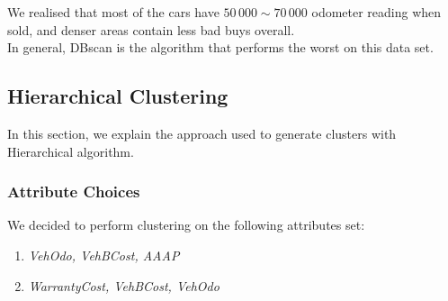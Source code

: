 \documentclass{article}
\begin{document}
	We realised that most of the cars have $50\,000 \sim 70\,000$ odometer reading when sold, and denser areas contain less bad buys overall. \\
	In general, DBscan is the algorithm that performs the worst on this data set.
	
	\subsection{Hierarchical Clustering}
	In this section, we explain the approach used to generate clusters with Hierarchical algorithm.
	\subsubsection{Attribute Choices}
	We decided to perform clustering on the following attributes set:
	\begin{enumerate}
		\item \emph{VehOdo, VehBCost, AAAP}
		\item \emph{WarrantyCost, VehBCost, VehOdo}
	\end{enumerate}
	
\end{document}
